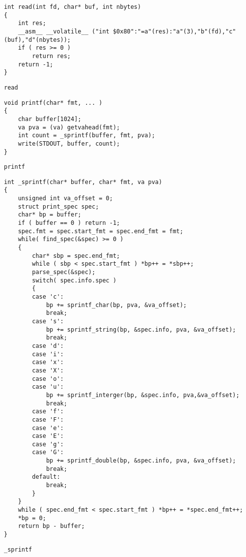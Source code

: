 \begin{listing}[htbp]
    \begin{verbatim}
int read(int fd, char* buf, int nbytes)
{
    int res;
    __asm__ __volatile__ ("int $0x80":"=a"(res):"a"(3),"b"(fd),"c"(buf),"d"(nbytes));
    if ( res >= 0 )
        return res;
    return -1;
}
    \end{verbatim}
    \caption{\texttt{read}}\label{lst:read}
\end{listing}



\begin{listing}[htbp]
    \begin{verbatim}
void printf(char* fmt, ... )
{
    char buffer[1024];
    va pva = (va) getvahead(fmt);
    int count = _sprintf(buffer, fmt, pva);    
    write(STDOUT, buffer, count);
}
    \end{verbatim}
    \caption{\texttt{printf}}\label{lst:printf}
\end{listing}

\begin{listing}[htbp]
    \begin{verbatim}
int _sprintf(char* buffer, char* fmt, va pva)
{
    unsigned int va_offset = 0;
    struct print_spec spec;
    char* bp = buffer;
    if ( buffer == 0 ) return -1;
    spec.fmt = spec.start_fmt = spec.end_fmt = fmt;
    while( find_spec(&spec) >= 0 )
    {
        char* sbp = spec.end_fmt;        
        while ( sbp < spec.start_fmt ) *bp++ = *sbp++;
        parse_spec(&spec);        
        switch( spec.info.spec )
        {
        case 'c':
            bp += sprintf_char(bp, pva, &va_offset);            
            break;
        case 's':
            bp += sprintf_string(bp, &spec.info, pva, &va_offset);
            break;            
        case 'd':
        case 'i':
        case 'x':
        case 'X':
        case 'o':
        case 'u':
            bp += sprintf_interger(bp, &spec.info, pva,&va_offset);
            break;
        case 'f':
        case 'F':
        case 'e':
        case 'E':
        case 'g':
        case 'G':
            bp += sprintf_double(bp, &spec.info, pva, &va_offset);
            break;
        default:
            break;
        }        
    }
    while ( spec.end_fmt < spec.start_fmt ) *bp++ = *spec.end_fmt++;
    *bp = 0;
    return bp - buffer;
}
    \end{verbatim}
    \caption{\texttt{\_sprintf}}\label{lst:sprintf}
\end{listing}

